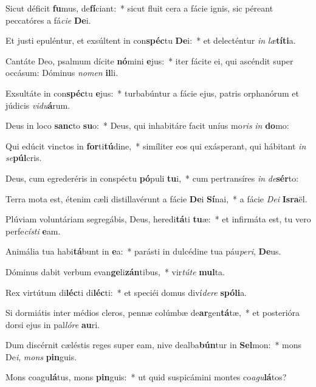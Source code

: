 \item Sicut déficit \textbf{fu}mus, de\textbf{fí}ciant:~* sicut fluit cera a fácie ignis, sic péreant peccatóres a fá\textit{ci}\textit{e} \textbf{De}i.
\item Et justi epuléntur, et exsúltent in con\textbf{spéc}tu \textbf{De}i:~* et delecténtur \textit{in} \textit{læ}\textbf{tí}\textbf{ti}a.
\item Cantáte Deo, psalmum dícite \textbf{nó}mini \textbf{e}jus:~* iter fácite ei, qui ascéndit super occásum: Dóminus \textit{no}\textit{men} \textbf{il}li.
\item Exsultáte in con\textbf{spéc}tu \textbf{e}jus:~* turbabúntur a fácie ejus, patris orphanórum et júdicis \textit{vi}\textit{du}\textbf{á}rum.
\item Deus in loco \textbf{sanc}to \textbf{su}o:~* Deus, qui inhabitáre facit uníus mo\textit{ris} \textit{in} \textbf{do}mo:
\item Qui edúcit vinctos in \textbf{for}ti\textbf{tú}dine,~* simíliter eos qui exásperant, qui hábitant \textit{in} \textit{se}\textbf{púl}cris.
\item Deus, cum egrederéris in conspéctu \textbf{pó}puli \textbf{tu}i,~* cum pertransíres \textit{in} \textit{de}\textbf{sér}to:
\item Terra mota est, étenim cæli distillavérunt a fácie \textbf{De}i \textbf{Sí}nai,~* a fácie \textit{De}\textit{i} \textbf{Is}\textbf{ra}ël.
\item Plúviam voluntáriam segregábis, Deus, heredi\textbf{tá}ti \textbf{tu}æ:~* et infirmáta est, tu vero perfe\textit{cís}\textit{ti} \textbf{e}am.
\item Animália tua habi\textbf{tá}bunt in \textbf{e}a:~* parásti in dulcédine tua páu\textit{pe}\textit{ri}, \textbf{De}us.
\item Dóminus dabit verbum evan\textbf{ge}li\textbf{zán}tibus,~* vir\textit{tú}\textit{te} \textbf{mul}ta.
\item Rex virtútum di\textbf{léc}ti di\textbf{léc}ti:~* et speciéi domus diví\textit{de}\textit{re} \textbf{spó}\textbf{li}a.
\item Si dormiátis inter médios cleros, pennæ colúmbæ de\textbf{ar}gen\textbf{tá}tæ,~* et posterióra dorsi ejus in pal\textit{ló}\textit{re} \textbf{au}ri.
\item Dum discérnit cæléstis reges super eam, nive dealba\textbf{bún}tur in \textbf{Sel}mon:~* mons De\textit{i}, \textit{mons} \textbf{pin}guis.
\item Mons coagu\textbf{lá}tus, mons \textbf{pin}guis:~* ut quid suspicámini montes co\textit{a}\textit{gu}\textbf{lá}tos?
